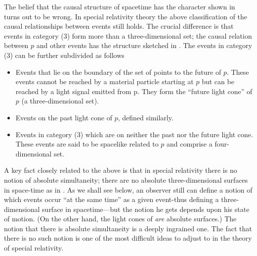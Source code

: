 The belief that the causal structure of spacetime has the character shown in  turns out to be wrong. In special relativity theory the above classification of the causal relationships between events still holds. The crucial difference is that events in category (3) form more than a three-dimensional set; the causal relation between $p$ and other events has the structure sketched in . The events in category (3) can be further subdivided as follows
\begin{itemize}
    \item Events that lie on the boundary of the set of points to the future of $p$. These events cannot be reached by a material particle starting at $p$ but can be reached by a light signal emitted from p. They form the ``future light cone'' of $p$ (a three-dimensional set).
    \item Events on the past light cone of $p$, defined similarly.
    \item Events in category (3) which are on neither the past nor the future light cone. These events are said to be spacelike related to $p$ and comprise a four-dimensional set.
\end{itemize}
    
A key fact closely related to the above is that in special relativity there is no notion of absolute simultaneity; there are no absolute three-dimensional surfaces in space-time as in . As we shall see below, an observer still can define a notion of which events occur ``at the same time'' as a given event-thus defining a three-dimensional surface in spacetime—but the notion he gets depends upon his state of motion. (On the other hand, the light cones of  \emph{are} absolute surfaces.) The notion that there is absolute simultaneity is a deeply ingrained one. The fact that there is no such notion is one of the most difficult ideas to adjust to in the theory of special relativity.

